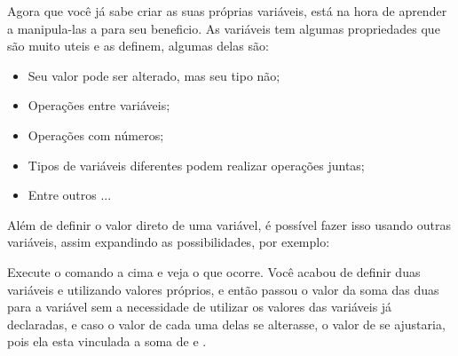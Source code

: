  Agora que você já sabe criar as suas próprias variáveis, está na hora de aprender a manipula-las a para seu beneficio. As variáveis tem algumas propriedades que são muito uteis e as definem, algumas delas são:


\begin{itemize}
	\item Seu valor pode ser alterado, mas seu tipo não;
	\item Operações entre variáveis;
	\item Operações com números;
	\item Tipos de variáveis diferentes podem realizar operações juntas;
	\item Entre outros ...
\end{itemize}

Além de definir o valor direto de uma variável, é possível fazer isso usando outras variáveis, assim expandindo as possibilidades, por exemplo:


Execute o comando a cima e veja o que ocorre. Você acabou de definir duas variáveis  e  utilizando valores próprios, e então passou o valor da soma das duas para a variável  sem a necessidade de utilizar os valores das variáveis já declaradas, e caso o valor de cada uma delas se alterasse, o valor de  se ajustaria, pois ela esta vinculada a soma de  e .